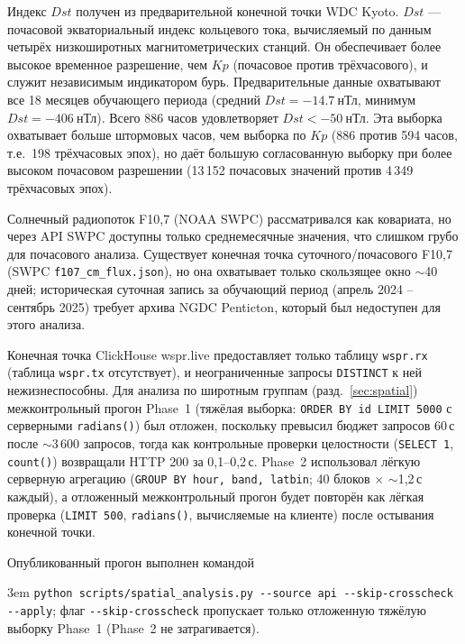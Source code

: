 \documentclass{agujournal2019}
\begin{document}
Индекс $Dst$ получен из предварительной конечной
точки WDC Kyoto. $Dst$ — почасовой экваториальный индекс кольцевого тока,
вычисляемый по данным четырёх низкоширотных магнитометрических станций.
Он обеспечивает более высокое временное разрешение, чем $Kp$ (почасовое
против трёхчасового), и служит независимым индикатором бурь. Предварительные
данные охватывают все 18 месяцев обучающего периода (средний
$Dst = \SI{-14.7}{\mbox{нТл}}$, минимум $Dst = \SI{-406}{\mbox{нТл}}$). Всего 886 часов
удовлетворяет $Dst < \SI{-50}{\mbox{нТл}}$. Эта выборка охватывает больше штормовых
часов, чем выборка по $Kp$ (886 против 594 часов, т.е.\ 198 трёхчасовых
эпох), но даёт большую согласованную выборку при более высоком почасовом
разрешении (13\,152 почасовых значений против 4\,349 трёхчасовых эпох).

Солнечный радиопоток F10,7 (NOAA SWPC) рассматривался как ковариата, но
через API SWPC доступны только среднемесячные значения, что слишком грубо
для почасового анализа. Существует конечная точка суточного/почасового
F10,7 (SWPC \texttt{f107\_cm\_flux.json}), но она охватывает только
скользящее окно $\sim$40 дней; историческая суточная запись за обучающий
период (апрель 2024 -- сентябрь 2025) требует архива NGDC Penticton,
который был недоступен для этого анализа.


Конечная точка ClickHouse wspr.live предоставляет только таблицу
\texttt{wspr.rx} (таблица \texttt{wspr.tx} отсутствует), и неограниченные
запросы \texttt{DISTINCT} к ней нежизнеспособны. Для анализа по широтным
группам (разд.~\ref{sec:spatial}) межконтрольный прогон Phase~1 (тяжёлая
выборка: \texttt{ORDER BY id LIMIT 5000} с серверными \texttt{radians()})
был отложен, поскольку превысил бюджет запросов 60\,с после
$\sim$3\,600 запросов, тогда как контрольные проверки целостности
(\texttt{SELECT 1}, \texttt{count()}) возвращали HTTP 200 за
0,1--0,2\,с. Phase~2 использовал лёгкую серверную агрегацию
(\texttt{GROUP BY hour, band, latbin}; 40 блоков $\times$
$\sim$1,2\,с каждый), а отложенный межконтрольный прогон будет повторён
как лёгкая проверка (\texttt{LIMIT 500}, \texttt{radians()}, вычисляемые
на клиенте) после остывания конечной точки.

Опубликованный прогон выполнен командой
{\sloppy\emergencystretch 3em
\texttt{python scripts/spatial\_analysis.py -\kern0pt-source api -\kern0pt-skip-crosscheck -\kern0pt-apply};
флаг \verb|--skip-crosscheck| пропускает только отложенную тяжёлую
выборку Phase~1 (Phase~2 не затрагивается).
\par}
\end{document}

